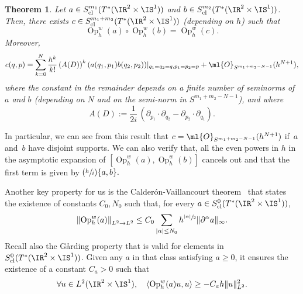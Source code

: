 \documentclass[JEP,XML,SOM,Unicode, NoEqCountersInSection,published]{cedram}
\newcommand{\Psfrac}[2]{(\sfrac{#1}{#2})}
\theoremstyle{plain}
\newtheorem{theo}{Theorem}[section]
\theoremstyle{definition}
\theoremstyle{remark}
\newcommand{\Op}{\operatorname{Op}}
\begin{document}
\begin{theo}\label{t:composition}
Let $a\in S^{m_1}_{\textup{cl}}(T^*(\IR^2\times\IS^1))$ and $b\in S^{m_2}_{\textup{cl}}(T^*(\IR^2\times\IS^1))$. Then, there exists $c\in S^{m_1+m_2}_{\textup{cl}}(T^*(\IR^2\times\IS^1))$ (depending on $h$) such that\vspace*{-3pt}
\begin{equation}\label{e:composition-formula}\Op_h^w(a)\circ\Op_h^w(b)=\Op_h^w(c).\end{equation}
Moreover,\vspace*{-5pt}\enlargethispage{\baselineskip}
\[
c(q,p)=\sum_{k=0}^N\frac{h^k}{k!}\left(A(D)\right)^k(a(q_1,p_1)b(q_2,p_2))|_{q_1=q_2=q, p_1=p_2=p}+\ml{O}_{S^{m_1+m_2-N-1}}(h^{N+1}),
\]
where the constant in the remainder depends on a finite number of seminorms of $a$ and $b$ (depending on $N$ and on the semi-norm in $S^{m_1+m_2-N-1}$), and where\vspace*{-3pt}
\[
A(D):=\frac{1}{2i}\,(\partial_{p_1}\cdot\partial_{q_2}-\partial_{p_2}\cdot\partial_{q_1}).
\]
\end{theo}
In particular, we can see from this result that $c=\ml{O}_{S^{m_1+m_2-N-1}}(h^{N+1})$ if~$a$ and~$b$ have disjoint supports. We can also verify that, all the even powers in $h$ in the asymp\-totic expansion of $[\Op_h^w(a),\Op_h^w(b)]$ cancels out and that the first term is given by $\Psfrac{h}{i}\{a,b\}.$

Another key property for us is the Calderón-Vaillancourt theorem~\cite[Ch.\,5]{Zworski12} that states the existence of constants $C_0, N_0$ such that, for every $a\in S^{0}_{\textup{cl}}(T^*(\IR^2\times\IS^1))$,\vspace*{-3pt}
\begin{equation}\label{e:calderon}
\left\|\Op_h^w(a)\right\|_{L^2\to L^2}\leq C_0\sum_{|\alpha|\leq N_0}h^{\sfrac{|\alpha|}{2}}\|\partial^\alpha a\|_{\infty}.
\end{equation}
Recall also the G\aa rding property that is valid for elements in $S^{0}_{\textup{cl}}(T^*(\IR^2\times\IS^1))$. Given any $a$ in that class satisfying $a\geq 0$, it ensures the existence of a constant $C_a>0$ \cite[Th.\,4.32]{Zworski12} such that\vspace*{-3pt}
\begin{equation}\label{e:Garding0}\forall u\in L^2(\IR^2\times\IS^1),\quad\langle \Op_h^w(a)u,u\rangle\geq -C_a h\|u\|_{L^2}^2.
\end{equation}




\vspace*{-.5\baselineskip}
\enlargethispage{\baselineskip}
\end{document}
